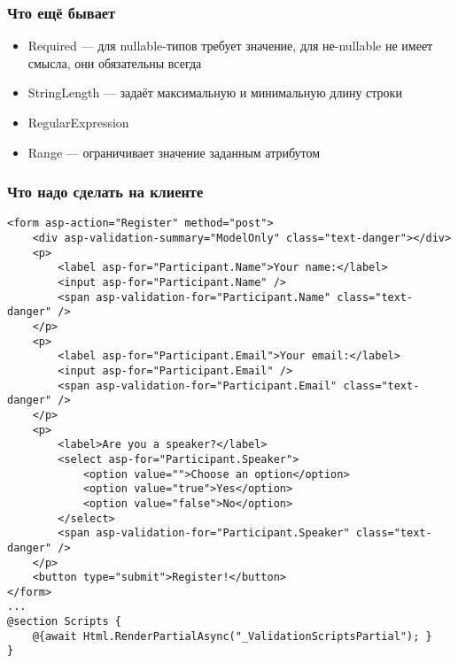 \documentclass[xetex,mathserif,serif]{beamer}
\begin{document}
	\begin{frame}
		\frametitle{Что ещё бывает}
		\begin{itemize}
			\item Required --- для nullable-типов требует значение, для не-nullable не имеет смысла, они обязательны всегда
			\item StringLength --- задаёт максимальную и минимальную длину строки
			\item RegularExpression
			\item Range --- ограничивает значение заданным атрибутом
		\end{itemize}
	\end{frame}

	\begin{frame}[fragile]
		\frametitle{Что надо сделать на клиенте}
		\begin{tiny}
			\begin{verbatim}
<form asp-action="Register" method="post">
    <div asp-validation-summary="ModelOnly" class="text-danger"></div>
    <p>
        <label asp-for="Participant.Name">Your name:</label>
        <input asp-for="Participant.Name" />
        <span asp-validation-for="Participant.Name" class="text-danger" />
    </p>
    <p>
        <label asp-for="Participant.Email">Your email:</label>
        <input asp-for="Participant.Email" />
        <span asp-validation-for="Participant.Email" class="text-danger" />
    </p>
    <p>
        <label>Are you a speaker?</label>
        <select asp-for="Participant.Speaker">
            <option value="">Choose an option</option>
            <option value="true">Yes</option>
            <option value="false">No</option>
        </select>
        <span asp-validation-for="Participant.Speaker" class="text-danger" />
    </p>
    <button type="submit">Register!</button>
</form>
...
@section Scripts {
    @{await Html.RenderPartialAsync("_ValidationScriptsPartial"); }
}
			\end{verbatim}
		\end{tiny}
	\end{frame}
\end{document}

